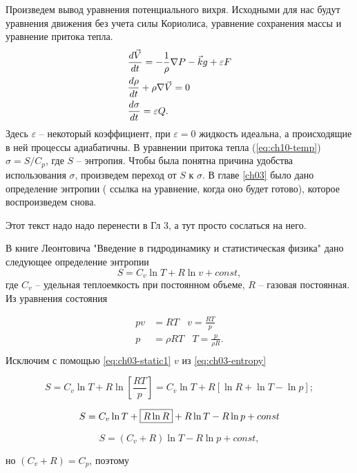 Произведем вывод уравнения потенциального вихря. Исходными для нас будут уравнения движения без учета силы Кориолиса, уравнение сохранения массы и уравнение притока тепла. 
\begin{align}
    &\displaystyle\frac{d \vec{V}}{d t} = -\frac{1}{\rho} \nabla P - \vec{k}g + \varepsilon F \label{eq:ch10-dudt_vec} \\
    &\displaystyle\frac{d \rho}{d t}+\rho \nabla \Vec{V}=0 \label{eq:ch10-masscons} \\
    &\displaystyle\frac{d \sigma}{d t} = \varepsilon Q \label{eq:ch10-temp}.
\end{align}
Здесь $\varepsilon$ -- некоторый коэффициент, при $\varepsilon=0$ жидкость идеальна, а происходящие в ней процессы адиабатичны. В уравнении притока тепла (\ref{eq:ch10-temp}) $\sigma=S/C_p$, где $S$ -- энтропия. Чтобы была понятна причина удобства использования $\sigma$, произведем переход от $S$ к $\sigma$. В главе \ref{ch03} было дано определение энтропии ({\color{red} ссылка на уравнение, когда оно будет готово}), которое воспроизведем снова.
\begin{warn}
    Этот текст надо надо перенести в Гл 3, а тут просто сослаться на него. 
\end{warn}
{\color{red}
В книге Леонтовича "Введение в гидродинамику и статистическая физика" дано следующее определение энтропии
\begin{equation}
    S = C_v \ln{T} + R \ln{v} + const, \label{eq:ch03-entropy}
\end{equation}
где $C_v$ -- удельная теплоемкость при постоянном объеме, $R$ -- газовая постоянная. Из уравнения состояния 

\begin{align}
    pv &= RT \:\:\:\: v=\frac{RT}{p} \label{eq:ch03-static1} \\
    p & =\rho R T \:\:\:\: T=\frac{p}{\rho R} \label{eq:ch03-static2}. \\
\end{align}
Исключим с помощью \ref{eq:ch03-static1} $v$ из \ref{eq:ch03-entropy}

    \[ S = C_v \ln{T} + R \ln{ \left[ \frac{RT}{p} \right]} = C_v \ln{T} + R \left[ \ln{R} + \ln{T} - \ln{p} \right]; \]

\newpage

    \[ S = C_v \ln{T} +  \boxed{R \tikzmark{z1}\ln{R}}  + R \ln{T} - R \ln{p} +  co\tikzmark{z2}nst \]
    \[ S = ( C_v + R) \ln{T} - R \ln{p} + const,  \]

но $(C_v+R)=C_p$, поэтому
}
